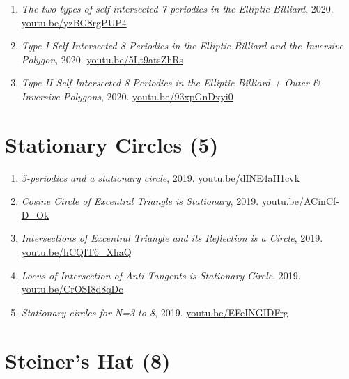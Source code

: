 \documentclass[12pt]{article}
\begin{document}
\begin{enumerate}[resume]
\item \textit{The two types of self-intersected 7-periodics in the Elliptic Billiard}, 2020. \href{https://youtu.be/yzBG8rgPUP4}{\url{youtu.be/yzBG8rgPUP4}}
\item \textit{Type I Self-Intersected 8-Periodics in the Elliptic Billiard and the Inversive Polygon}, 2020. \href{https://youtu.be/5Lt9atsZhRs}{\url{youtu.be/5Lt9atsZhRs}}
\item \textit{Type II Self-Intersected 8-Periodics in the Elliptic Billiard + Outer \& Inversive Polygons}, 2020. \href{https://youtu.be/93xpGnDxyi0}{\url{youtu.be/93xpGnDxyi0}}
\end{enumerate}

\section{Stationary Circles (5)}

\begin{enumerate}[resume]
\item \textit{5-periodics and a stationary circle}, 2019. \href{https://youtu.be/dINE4aH1cvk}{\url{youtu.be/dINE4aH1cvk}}
\item \textit{Cosine Circle of Excentral Triangle is Stationary}, 2019. \href{https://youtu.be/ACinCf-D_Ok}{\url{youtu.be/ACinCf-D\_Ok}}
\item \textit{Intersections of Excentral Triangle and its Reflection is a Circle}, 2019. \href{https://youtu.be/hCQIT6_XhaQ}{\url{youtu.be/hCQIT6\_XhaQ}}
\item \textit{Locus of Intersection of Anti-Tangents is Stationary Circle}, 2019. \href{https://youtu.be/CrOSI8d8qDc}{\url{youtu.be/CrOSI8d8qDc}}
\item \textit{Stationary circles for N=3 to 8}, 2019. \href{https://youtu.be/EFeINGIDFrg}{\url{youtu.be/EFeINGIDFrg}}
\end{enumerate}

\section{Steiner's Hat (8)}
\end{document}

